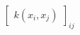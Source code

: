 \documentclass[preview]{standalone}
\begin{document}
\begin{align*}
\begin{bmatrix}k(x_i,x_j)\end{bmatrix}_{ij}
\end{align*}
\end{document}
